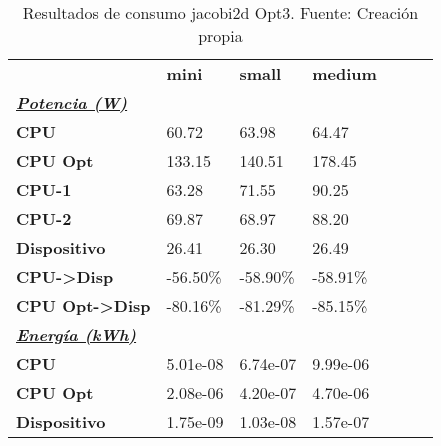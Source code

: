\begin{table}[H]
    \centering
    \begin{tabular}{lllllll}
    \rowcolor[HTML]{DAE8FC} \ & \textbf{mini} & \textbf{	small} & \textbf{	medium} \\
    \cellcolor[HTML]{DAE8FC} \textbf{\textbf{{\emph{{\underline{{Potencia (W)}}}}}}} &  & 	 & 	 \\
    \rowcolor[HTML]{EFEFEF} \cellcolor[HTML]{DAE8FC} \textbf{CPU} & 60.72 & 	63.98 & 	64.47 \\
    \cellcolor[HTML]{DAE8FC} \textbf{CPU Opt} & 133.15 & 	140.51 & 	178.45 \\
    \rowcolor[HTML]{EFEFEF} \cellcolor[HTML]{DAE8FC} \textbf{\quad CPU-1} & 63.28 & 	71.55 & 	90.25 \\
    \cellcolor[HTML]{DAE8FC} \textbf{\quad CPU-2} & 69.87 & 	68.97 & 	88.20 \\
    \rowcolor[HTML]{EFEFEF} \cellcolor[HTML]{DAE8FC} \textbf{Dispositivo} & 26.41 & 	26.30 & 	26.49 \\
    \cellcolor[HTML]{DAE8FC} \textbf{CPU->Disp} & -56.50\% & 	-58.90\% & 	-58.91\% \\
    \rowcolor[HTML]{EFEFEF} \cellcolor[HTML]{DAE8FC} \textbf{CPU Opt->Disp} & -80.16\% & 	-81.29\% & 	-85.15\% \\
    \cellcolor[HTML]{DAE8FC} \textbf{\textbf{{\emph{{\underline{{Energía (kWh)}}}}}}} &  & 	 & 	 \\
    \rowcolor[HTML]{EFEFEF} \cellcolor[HTML]{DAE8FC} \textbf{CPU} & 5.01e-08 & 	6.74e-07 & 	9.99e-06 \\
    \cellcolor[HTML]{DAE8FC} \textbf{CPU Opt} & 2.08e-06 & 	4.20e-07 & 	4.70e-06 \\
    \rowcolor[HTML]{EFEFEF} \cellcolor[HTML]{DAE8FC} \textbf{Dispositivo} & 1.75e-09 & 	1.03e-08 & 	1.57e-07 \\
    \end{tabular}
    \caption[Resultados de consumo jacobi2d Opt3]{{Resultados de consumo jacobi2d Opt3. Fuente: Creación propia}}
    \label{table_test_jacobi2d_Opt3_hw_powerResults}
\end{table}